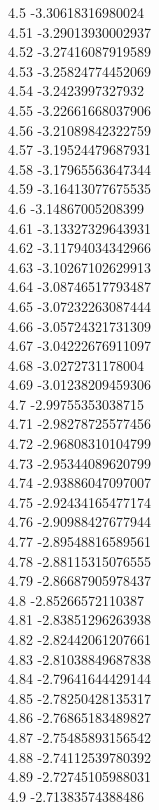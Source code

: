 {4.5	-3.30618316980024\\
4.51	-3.29013930002937\\
4.52	-3.27416087919589\\
4.53	-3.25824774452069\\
4.54	-3.2423997327932\\
4.55	-3.22661668037906\\
4.56	-3.21089842322759\\
4.57	-3.19524479687931\\
4.58	-3.17965563647344\\
4.59	-3.16413077675535\\
4.6	-3.14867005208399\\
4.61	-3.13327329643931\\
4.62	-3.11794034342966\\
4.63	-3.10267102629913\\
4.64	-3.08746517793487\\
4.65	-3.07232263087444\\
4.66	-3.05724321731309\\
4.67	-3.04222676911097\\
4.68	-3.0272731178004\\
4.69	-3.01238209459306\\
4.7	-2.99755353038715\\
4.71	-2.98278725577456\\
4.72	-2.96808310104799\\
4.73	-2.95344089620799\\
4.74	-2.93886047097007\\
4.75	-2.92434165477174\\
4.76	-2.90988427677944\\
4.77	-2.89548816589561\\
4.78	-2.88115315076555\\
4.79	-2.86687905978437\\
4.8	-2.85266572110387\\
4.81	-2.83851296263938\\
4.82	-2.82442061207661\\
4.83	-2.81038849687838\\
4.84	-2.79641644429144\\
4.85	-2.78250428135317\\
4.86	-2.76865183489827\\
4.87	-2.75485893156542\\
4.88	-2.74112539780392\\
4.89	-2.72745105988031\\
4.9	-2.71383574388486\\
}
